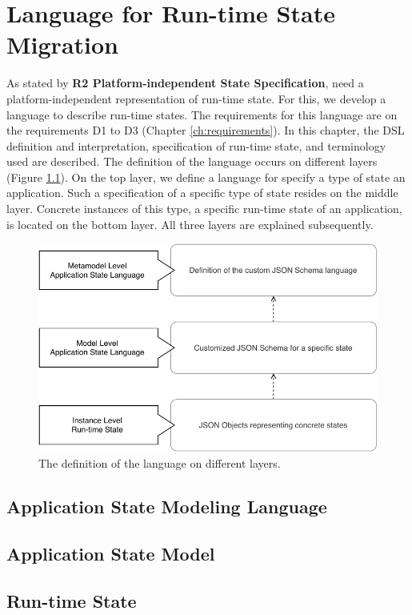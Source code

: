 \chapter{Language for Run-time State Migration}
\label{ch:language}
As stated by \textbf{R2 Platform-independent State Specification}, need a platform-independent representation of run-time state. For this, we develop a language to describe run-time states. The requirements for this language are on the requirements D1 to D3 (Chapter \ref{ch:requirements}).
In this chapter, the DSL definition and interpretation, specification of run-time state, and terminology used are described.
The definition of the language occurs on different layers (Figure \ref{fig:asml}). On the top layer, we define a language for specify a type of state an application. Such a specification of a specific type of state resides on the middle layer. Concrete instances of this type, a specific run-time state of an application, is located on the bottom layer. All three layers are explained subsequently.

\FloatBarrier
\begin{figure}[H]
    \includegraphics[scale=0.8]{../figures/asml.pdf}
    \centering
    \caption{The definition of the language on different layers.}
    \label{fig:asml}
\end{figure}
\FloatBarrier


\section{Application State Modeling Language}


\section{Application State Model}


\section{Run-time State}
